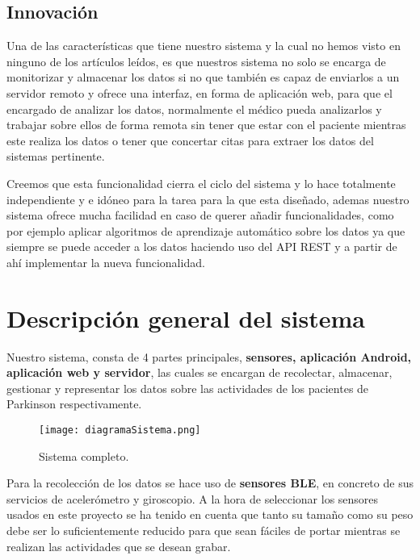\documentclass[11pt,spanish]{article}
\begin{document}
\subsection{Innovación}

Una de las características que tiene nuestro sistema y la cual no hemos visto en ninguno de los artículos leídos, es que nuestros sistema no solo se encarga de monitorizar y almacenar los datos si no que también es capaz de enviarlos a un servidor remoto y ofrece una interfaz, en forma de aplicación web, para que el encargado de analizar los datos, normalmente el médico pueda analizarlos y trabajar sobre ellos de forma remota sin tener que estar con el paciente mientras este realiza los datos o tener que concertar citas para extraer los datos del sistemas pertinente.
\newline

Creemos que esta funcionalidad cierra el ciclo del sistema y lo hace totalmente independiente y e idóneo para la tarea para la que esta diseñado, ademas nuestro sistema ofrece mucha facilidad en caso de querer añadir funcionalidades, como por ejemplo aplicar algoritmos de aprendizaje automático sobre los datos ya que siempre se puede acceder a los datos haciendo uso del API REST y a partir de ahí implementar la nueva funcionalidad.
\newpage

\section{Descripción general del sistema}
Nuestro sistema, consta de 4 partes principales, \textbf{sensores, aplicación Android, aplicación web y servidor}, las cuales se encargan de recolectar, almacenar, gestionar y representar los datos sobre las actividades de los pacientes de Parkinson respectivamente.
\newline 

\begin{figure}[H]
  \centering
  \texttt{[image: diagramaSistema.png]}
  \caption{Sistema completo.}
\end{figure}

Para la recolección de los datos se hace uso de \textbf{sensores BLE}, en concreto de sus servicios de acelerómetro y giroscopio. A la hora de seleccionar los sensores usados en este proyecto se ha tenido en cuenta que tanto su tamaño como su peso debe ser lo suficientemente reducido para que sean fáciles de portar mientras se realizan las actividades que se desean grabar.
\newline
\end{document}
